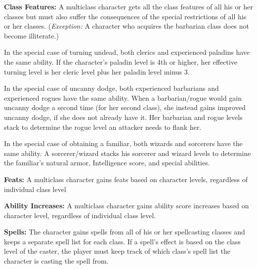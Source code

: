 \documentclass{article}
\begin{document}
\textbf{Class Features:} A multiclass character gets all the class features of 
all his or her classes but must also suffer the consequences of the special restrictions 
of all his or her classes. (\textit{Exception: }A character who acquires the barbarian 
class does not become illiterate.) 

In the special case of turning undead, both clerics and experienced paladins have 
the same ability. If the character's paladin level is 4th or higher, her effective 
turning level is her cleric level plus her paladin level minus 3. 

In the special case of uncanny dodge, both experienced barbarians and experienced 
rogues have the same ability. When a barbarian/rogue would gain uncanny dodge a 
second time (for her second class), she instead gains improved uncanny dodge, if 
she does not already have it. Her barbarian and rogue levels stack to determine 
the rogue level an attacker needs to flank her. 

In the special case of obtaining a familiar, both wizards and sorcerers have the 
same ability. A sorcerer/wizard stacks his sorcerer and wizard levels to determine 
the familiar's natural armor, Intelligence score, and special abilities.

\textbf{Feats: }A multiclass character gains feats based on character levels, regardless 
of individual class level

\textbf{Ability Increases:} A multiclass character gains ability score increases 
based on character level, regardless of individual class level.

\textbf{Spells:} The character gains spells from all of his or her spellcasting 
classes and keeps a separate spell list for each class. If a spell's effect is 
based on the class level of the caster, the player must keep track of which class's 
spell list the character is casting the spell fr{\small{}om.}

\newpage
\end{document}
